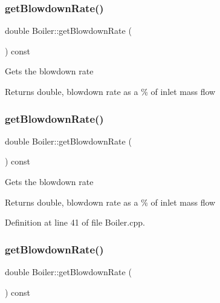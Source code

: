\subsubsection{\texorpdfstring{get\+Blowdown\+Rate()}{getBlowdownRate()}\hspace{0.1cm}{\footnotesize\ttfamily [1/3]}}
{\footnotesize\ttfamily double Boiler\+::get\+Blowdown\+Rate (\begin{DoxyParamCaption}{ }\end{DoxyParamCaption}) const}

Gets the blowdown rate \begin{DoxyReturn}{Returns}
double, blowdown rate as a \% of inlet mass flow 
\end{DoxyReturn}
\mbox{\label{class_boiler_aec9bf6eeed82d8d5f35284c65a3986e7}} 
\subsubsection{\texorpdfstring{get\+Blowdown\+Rate()}{getBlowdownRate()}\hspace{0.1cm}{\footnotesize\ttfamily [2/3]}}
{\footnotesize\ttfamily double Boiler\+::get\+Blowdown\+Rate (\begin{DoxyParamCaption}{ }\end{DoxyParamCaption}) const}

Gets the blowdown rate \begin{DoxyReturn}{Returns}
double, blowdown rate as a \% of inlet mass flow 
\end{DoxyReturn}


Definition at line 41 of file Boiler.\+cpp.

\mbox{\label{class_boiler_aec9bf6eeed82d8d5f35284c65a3986e7}} 
\subsubsection{\texorpdfstring{get\+Blowdown\+Rate()}{getBlowdownRate()}\hspace{0.1cm}{\footnotesize\ttfamily [3/3]}}
{\footnotesize\ttfamily double Boiler\+::get\+Blowdown\+Rate (\begin{DoxyParamCaption}{ }\end{DoxyParamCaption}) const}

